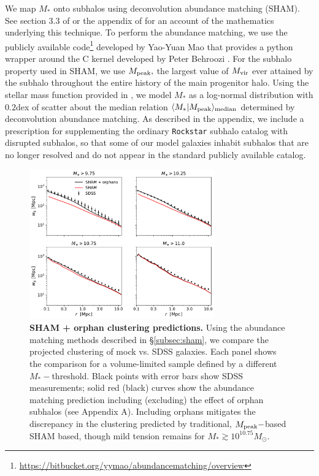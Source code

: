 \documentclass[usenatbib,usegraphicx,letterpaper]{mn2e}
\newcommand{\mstar}{M_{\ast}}
\newcommand{\mvir}{M_{\rm vir}}
\newcommand{\mpeak}{M_{\rm peak}}
\newcommand{\median}[2]{\langle{#1}\vert{#2}\rangle_{\rm median}}
\newcommand{\msun}{M_\odot}
\begin{document}
We map $\mstar$ onto subhalos using deconvolution abundance matching (SHAM). See section 3.3 of \citet{behroozi_etal10} or the appendix of \citet{kravtsov_etal14} for an account of the mathematics underlying this technique. To perform the abundance matching, we use the publicly available code\footnote{\url{https://bitbucket.org/yymao/abundancematching/overview}} developed by Yao-Yuan Mao \citep{lehmann_etal15} that provides a python wrapper around the C kernel developed by Peter Behroozi \citep{behroozi_etal10}. For the subhalo property used in SHAM, we use $\mpeak,$ the largest value of $\mvir$ ever attained by the subhalo throughout the entire history of the main progenitor halo.  Using the stellar mass function provided in \citet{moustakas_etal13}, we model $\mstar$ as a log-normal distribution with $0.2$dex of scatter about the median relation $\median{\mstar}{\mpeak}$ determined by deconvolution abundance matching. As described in the appendix, we include a prescription for supplementing the ordinary {\tt Rockstar} subhalo catalog with disrupted subhalos, so that some of our model galaxies inhabit subhalos that are no longer resolved and do not appear in the standard publicly available catalog.

\begin{figure}
\centering
\includegraphics[width=8cm]{FIGS/baseline_sham_orphans.pdf}
\caption{
{\bf SHAM + orphan clustering predictions.}
Using the abundance matching methods described in \S\ref{subsec:sham}, we compare the projected clustering of mock vs. SDSS galaxies. Each panel shows the comparison for a volume-limited sample defined by a different $\mstar-$threshold. Black points with error bars show SDSS measurements; solid red (black) curves show the abundance matching prediction including (excluding) the effect of orphan subhalos (see Appendix A). Including orphans mitigates the discrepancy in the clustering predicted by traditional, $\mpeak-$based SHAM based, though mild tension remains for $\mstar\gtrsim10^{10.75}\msun.$
}
\label{fig:baseline_sham_clustering}
\end{figure}
\end{document}
